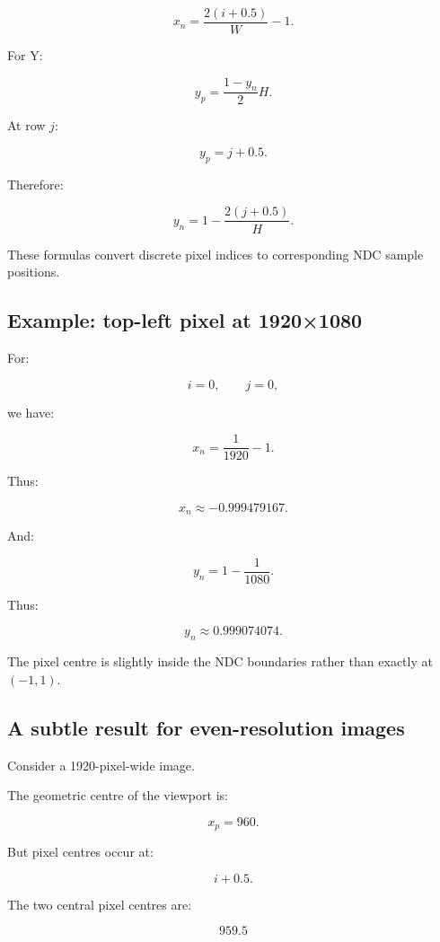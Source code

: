 \[
 \boxed{ x_n=\frac{2(i+0.5)}W-1 }.
\]

For Y:

\[
 y_p=\frac{1-y_n}{2}H.
\]

At row \(j\):

\[
 y_p=j+0.5.
\]

Therefore:

\[
 \boxed{ y_n=1-\frac{2(j+0.5)}H }.
\]

These formulas convert discrete pixel indices to corresponding NDC sample positions.

\begin{allmightroleexample}

\subsection{Example: top-left pixel at 1920×1080}\label{02-foundations-ii-ch033-example-top-left-pixel-at-19201080}

For:

\end{allmightroleexample}

\[
 i=0,\qquad j=0,
\]

we have:

\[
 x_n=\frac1{1920}-1.
\]

Thus:

\[
 \boxed{x_n\approx-0.999479167}.
\]

And:

\[
 y_n=1-\frac1{1080}.
\]

Thus:

\[
 \boxed{y_n\approx0.999074074}.
\]

The pixel centre is slightly inside the NDC boundaries rather than exactly at \((-1,1)\).

\subsection{A subtle result for even-resolution images}\label{02-foundations-ii-ch033-a-subtle-result-for-even-resolution-images}

Consider a 1920-pixel-wide image.

The geometric centre of the viewport is:

\[
 x_p=960.
\]

But pixel centres occur at:

\[
 i+0.5.
\]

The two central pixel centres are:

\[
 959.5
\]

